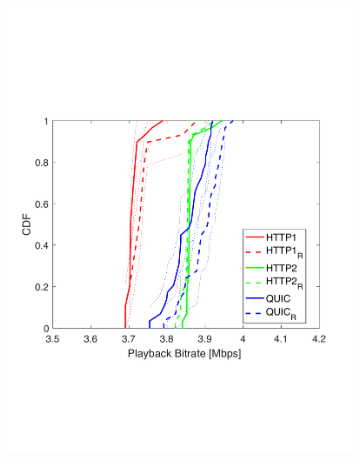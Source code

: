 \begin{figure}[t!]
\centering
\begin{subfigure}[t]{0.33\textwidth}
   \captionsetup{justification=centering,margin=4.5cm}
    \includegraphics[trim={0 5cm 0 6cm}, scale=0.24]{figures/CDF_bitrat_squad_udpstair_nd18.pdf}
     \caption{}
    \label{fig:udpstairbitrate}
  \end{subfigure}
  \begin{subfigure}[t]{0.33\textwidth}
  \captionsetup{justification=raggedright,singlelinecheck=false,margin=2.5cm}

\end{subfigure}
\end{figure}
